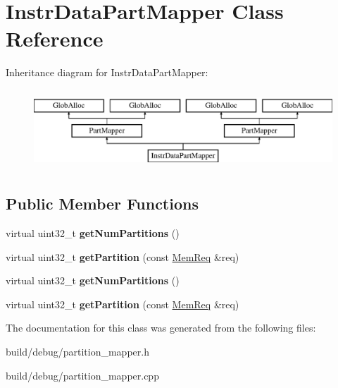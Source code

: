 \hypertarget{classInstrDataPartMapper}{\section{Instr\-Data\-Part\-Mapper Class Reference}
\label{classInstrDataPartMapper}
}
Inheritance diagram for Instr\-Data\-Part\-Mapper\-:\begin{figure}[H]
\begin{center}
\leavevmode
\includegraphics[height=3.000000cm]{classInstrDataPartMapper}
\end{center}
\end{figure}
\subsection*{Public Member Functions}
\begin{DoxyCompactItemize}
\item 
\hypertarget{classInstrDataPartMapper_a64f091e8c3737da1dd7146931f74d926}{virtual uint32\-\_\-t {\bfseries get\-Num\-Partitions} ()}\label{classInstrDataPartMapper_a64f091e8c3737da1dd7146931f74d926}

\item 
\hypertarget{classInstrDataPartMapper_a7edb4dbecd6495a2a29d4896c49958c2}{virtual uint32\-\_\-t {\bfseries get\-Partition} (const \hyperlink{structMemReq}{Mem\-Req} \&req)}\label{classInstrDataPartMapper_a7edb4dbecd6495a2a29d4896c49958c2}

\item 
\hypertarget{classInstrDataPartMapper_a64f091e8c3737da1dd7146931f74d926}{virtual uint32\-\_\-t {\bfseries get\-Num\-Partitions} ()}\label{classInstrDataPartMapper_a64f091e8c3737da1dd7146931f74d926}

\item 
\hypertarget{classInstrDataPartMapper_a02b43bf57a6c6a3c3731f6c932af1e26}{virtual uint32\-\_\-t {\bfseries get\-Partition} (const \hyperlink{structMemReq}{Mem\-Req} \&req)}\label{classInstrDataPartMapper_a02b43bf57a6c6a3c3731f6c932af1e26}

\end{DoxyCompactItemize}


The documentation for this class was generated from the following files\-:\begin{DoxyCompactItemize}
\item 
build/debug/partition\-\_\-mapper.\-h\item 
build/debug/partition\-\_\-mapper.\-cpp\end{DoxyCompactItemize}
